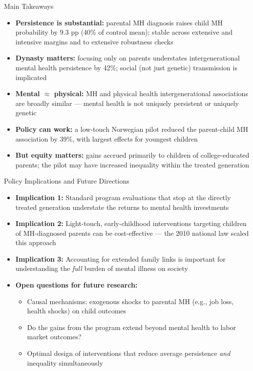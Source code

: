 \documentclass[aspectratio=169]{beamer}
\begin{document}
\begin{frame}{Main Takeaways}
  \begin{itemize}
    \item \textbf{Persistence is substantial:} parental MH diagnosis raises child MH probability by 9.3 pp (40\% of control mean); stable across extensive and intensive margins and to extensive robustness checks
    \item \textbf{Dynasty matters:} focusing only on parents understates intergenerational mental health persistence by 42\%; social (not just genetic) transmission is implicated
    \item \textbf{Mental $\approx$ physical:} MH and physical health intergenerational associations are broadly similar --- mental health is not uniquely persistent or uniquely genetic
    \item \textbf{Policy can work:} a low-touch Norwegian pilot reduced the parent-child MH association by 39\%, with largest effects for youngest children
    \item \textbf{But equity matters:} gains accrued primarily to children of college-educated parents; the pilot may have increased inequality within the treated generation
  \end{itemize}
\end{frame}

\begin{frame}{Policy Implications and Future Directions}
  \begin{itemize}
    \item \textbf{Implication 1:} Standard program evaluations that stop at the directly treated generation understate the returns to mental health investments
    \item \textbf{Implication 2:} Light-touch, early-childhood interventions targeting children of MH-diagnosed parents can be cost-effective --- the 2010 national law scaled this approach
    \item \textbf{Implication 3:} Accounting for extended family links is important for understanding the \emph{full} burden of mental illness on society
    \item \textbf{Open questions for future research:}
    \begin{itemize}
      \item Causal mechanisms: exogenous shocks to parental MH (e.g., job loss, health shocks) on child outcomes
      \item Do the gains from the program extend beyond mental health to labor market outcomes?
      \item Optimal design of interventions that reduce average persistence \emph{and} inequality simultaneously
    \end{itemize}
  \end{itemize}
\end{frame}
\end{document}
